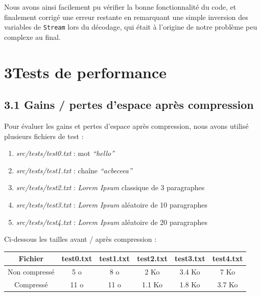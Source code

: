 \documentclass [a4paper,11pt] {report}
\begin{document}
Nous avons ainsi facilement pu vérifier la bonne fonctionnalité du code, et finalement corrigé une erreur restante en remarquant une simple inversion des variables de \lstinline!Stream! lors du décodage, qui était à l'origine de notre problème peu complexe au final.


\section* {3\hspace{5mm}Tests de performance }

\subsection* {3.1\hspace{3mm} Gains / pertes d'espace après compression}

Pour évaluer les gains et pertes d'espace après compression, nous avons utilisé plusieurs fichiers de test :

\begin{enumerate}

\item%
\textit{src/tests/test0.txt} : mot \textit{``hello''}

\item%
\textit{src/tests/test1.txt} : chaîne \textit{``acbeceea''}

\item%
\textit{src/tests/test2.txt} : \textit{Lorem Ipsum} classique de 3 paragraphes

\item%
\textit{src/tests/test3.txt} : \textit{Lorem Ipsum} aléatoire de 10 paragraphes

\item%
\textit{src/tests/test4.txt} : \textit{Lorem Ipsum} aléatoire de 20 paragraphes

\end{enumerate}
\vspace{0.5cm}

Ci-dessous les tailles avant / après compression :
\begin{center}
\begin{tabular}{|c|c|c|c|c|c|}
 \hline
Fichier & test0.txt & test1.txt & test2.txt & test3.txt & test4.txt\\
 \hline
Non compressé & 5 o & 8 o & 2 Ko & 3.4 Ko & 7 Ko\\
Compressé & 11 o & 11 o & 1.1 Ko & 1.8 Ko & 3.7 Ko\\
 \hline
\end{tabular}
\end{center}
\end{document}
